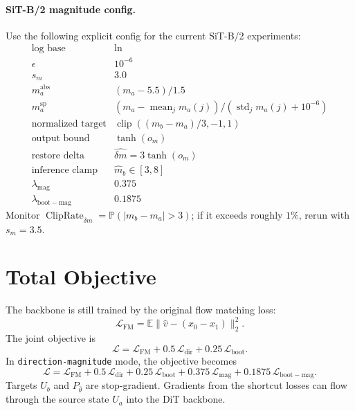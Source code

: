 \documentclass[11pt]{article}
\begin{document}
\paragraph{SiT-B/2 magnitude config.}
Use the following explicit config for the current SiT-B/2 experiments:
\[
\begin{array}{ll}
\text{log base} & \ln \\
\epsilon & 10^{-6} \\
s_m & 3.0 \\
m_a^{\mathrm{abs}} & (m_a-5.5)/1.5 \\
m_a^{\mathrm{sp}} & (m_a-\operatorname{mean}_j m_a(j))/(\operatorname{std}_j m_a(j)+10^{-6}) \\
\text{normalized target} & \operatorname{clip}((m_b-m_a)/3,-1,1) \\
\text{output bound} & \tanh(o_m) \\
\text{restore delta} & \hat{\delta m}=3\tanh(o_m) \\
\text{inference clamp} & \hat m_b\in[3,8] \\
\lambda_{\mathrm{mag}} & 0.375 \\
\lambda_{\mathrm{boot-mag}} & 0.1875
\end{array}
\]
Monitor $\operatorname{ClipRate}_{\delta m}=\mathbb{P}(|m_b-m_a|>3)$; if it
exceeds roughly $1\%$, rerun with $s_m=3.5$.

\section{Total Objective}
The backbone is still trained by the original flow matching loss:
\[
    \mathcal{L}_{\mathrm{FM}}
    =
    \mathbb{E}\|\hat v-(x_0-x_1)\|_2^2 .
\]
The joint objective is
\[
    \boxed{
    \mathcal{L}
    =
    \mathcal{L}_{\mathrm{FM}}
    +0.5\,\mathcal{L}_{\mathrm{dir}}
    +0.25\,\mathcal{L}_{\mathrm{boot}}
    }.
\]
In \texttt{direction-magnitude} mode, the objective becomes
\[
    \boxed{
    \mathcal{L}
    =
    \mathcal{L}_{\mathrm{FM}}
    +0.5\,\mathcal{L}_{\mathrm{dir}}
    +0.25\,\mathcal{L}_{\mathrm{boot}}
    +0.375\,\mathcal{L}_{\mathrm{mag}}
    +0.1875\,\mathcal{L}_{\mathrm{boot-mag}}
    }.
\]
Targets $U_b$ and $P_{\bar\theta}$ are stop-gradient. Gradients from the
shortcut losses can flow through the source state $U_a$ into the DiT backbone.
\end{document}
